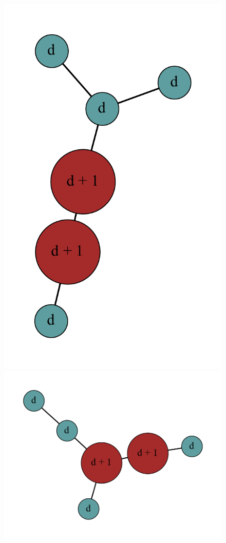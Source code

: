 \documentclass[12pt]{article}
\theoremstyle{plain}
\theoremstyle{definition}
\theoremstyle{remark}
\begin{document}
\begin{figure}[htb]
					\includegraphics[scale=0.25]{Superabundance/MaxDegree3Trees/000110010001010[3,1,1,1,3,3].pdf}
					\includegraphics[scale=0.25]{Superabundance/MaxDegree3Trees/001010011001000[2,3,1,1,1,4].pdf}

\end{figure}
\end{document}
